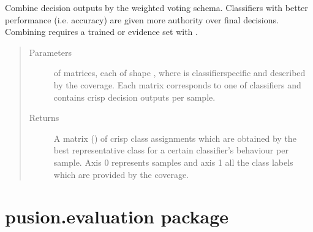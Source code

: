 \documentclass[letterpaper,10pt,english]{sphinxmanual}
\begin{document}
\begin{fulllineitems}
\begin{fulllineitems}
\label{\detokenize{pusion.core.weighted_voting_combiner:pusion.core.weighted_voting_combiner.CRWeightedVotingCombiner.combine}}
\sphinxAtStartPar
Combine decision outputs by the weighted voting schema.
Classifiers with better performance (i.e. accuracy) are given more authority over final decisions.
Combining requires a trained {\hyperref[\detokenize{pusion.core.weighted_voting_combiner:pusion.core.weighted_voting_combiner.WeightedVotingCombiner}]{}} or evidence set with .
\begin{quote}\begin{description}
\item[{Parameters}] \leavevmode
\sphinxAtStartPar
{} \textendash{}  of  matrices, each of shape ,
where  is classifier\sphinxhyphen{}specific and described by the coverage.
Each matrix corresponds to one of  classifiers and contains crisp decision outputs
per sample.

\item[{Returns}] \leavevmode
\sphinxAtStartPar
A matrix () of crisp class assignments which are obtained by the best representative class
for a certain classifier’s behaviour per sample. Axis 0 represents samples and axis 1 all the class
labels which are provided by the coverage.

\end{description}\end{quote}

\end{fulllineitems}


\end{fulllineitems}



\section{pusion.evaluation package}
\label{\detokenize{pusion.evaluation:pusion-evaluation-package}}\label{\detokenize{pusion.evaluation::doc}}
\end{document}
